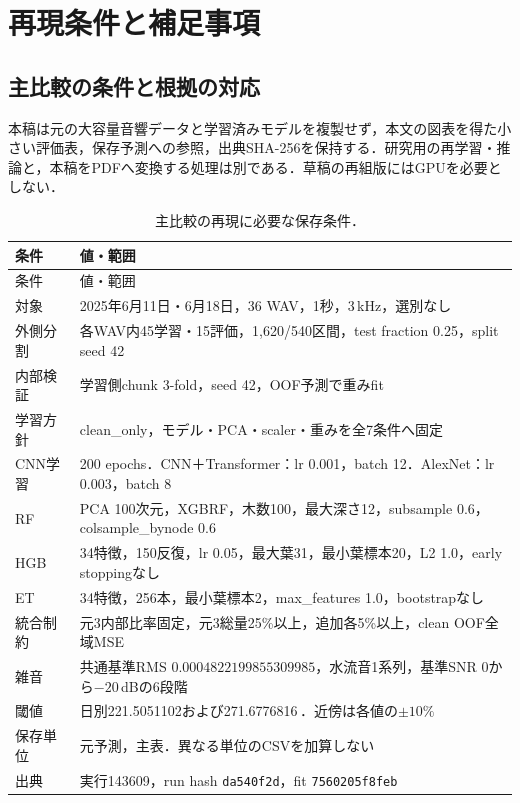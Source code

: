 \chapter{再現条件と補足事項}\label{app:repro}
\section{主比較の条件と根拠の対応}
本稿は元の大容量音響データと学習済みモデルを複製せず，本文の図表を得た小さい評価表，保存予測への参照，出典SHA-256を保持する．研究用の再学習・推論と，本稿をPDFへ変換する処理は別である．草稿の再組版にはGPUを必要としない．

\begin{longtable}{L{35mm}L{99mm}}
\caption{主比較の再現に必要な保存条件．}\label{tab:repro}\\
\toprule 条件 & 値・範囲 \\ \midrule\endfirsthead
\toprule 条件 & 値・範囲 \\ \midrule\endhead
対象 & 2025年6月11日・6月18日，36 WAV，1秒，3\,kHz，選別なし \\
外側分割 & 各WAV内45学習・15評価，1,620/540区間，test fraction 0.25，split seed 42 \\
内部検証 & 学習側chunk 3-fold，seed 42，OOF予測で重みfit \\
学習方針 & clean\_only，モデル・PCA・scaler・重みを全7条件へ固定 \\
CNN学習 & 200 epochs．CNN＋Transformer：lr 0.001，batch 12．AlexNet：lr 0.003，batch 8 \\
RF & PCA 100次元，XGBRF，木数100，最大深さ12，subsample 0.6，colsample\_bynode 0.6 \\
HGB & 34特徴，150反復，lr 0.05，最大葉31，最小葉標本20，L2 1.0，early stoppingなし \\
ET & 34特徴，256本，最小葉標本2，max\_features 1.0，bootstrapなし \\
統合制約 & 元3内部比率固定，元3総量25\%以上，追加各5\%以上，clean OOF全域MSE \\
雑音 & 共通基準RMS $0.0004822199855309985$，水流音1系列，基準SNR 0から$-20$\,dBの6段階 \\
閾値 & 日別221.5051102および271.6776816\,\kw{}．近傍は各値の$\pm10\%$ \\
保存単位 & 元予測\wm{}，主表\kw{}．異なる単位のCSVを加算しない \\
出典 & 実行143609，run hash \texttt{da540f2d}，fit \texttt{7560205f8feb} \\
\bottomrule
\end{longtable}

